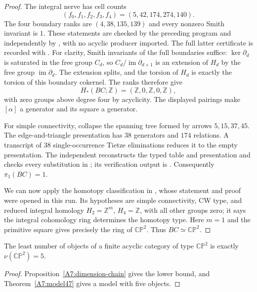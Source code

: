 \begin{proof}
The integral nerve has cell counts
\[
 (f_0,f_1,f_2,f_3,f_4)=(5,42,174,274,140).
\]
The four boundary ranks are $(4,38,135,139)$ and every nonzero
Smith invariant is $1$. These statements are checked by the
preceding program and independently by
, with no acyclic
producer imported. The full latter certificate is recorded with
.
For clarity, Smith invariants of the full boundaries suffice:
$\ker\partial_d$ is saturated in the free group $C_d$, so
$C_d/\operatorname{im}\partial_{d+1}$ is an extension of $H_d$
by the free group $\operatorname{im}\partial_d$. The extension
splits, and the torsion of $H_d$ is exactly the torsion of this
boundary cokernel. The ranks therefore give
\[
 H_*(BC;\mathbb Z)=(\mathbb Z,0,\mathbb Z,0,\mathbb Z),
\]
with zero groups above degree four by acyclicity. The displayed
pairings make $[\alpha]$ a generator and its square a generator.

For simple connectivity, collapse the spanning tree formed by
arrows $5,15,37,45$. The edge-and-triangle presentation has
$38$ generators and $174$ relations. A transcript of $38$
single-occurrence Tietze eliminations reduces it to the empty
presentation. The independent
 reconstructs the
typed table and presentation and checks every substitution in
; its verification output
is . Consequently
$\pi_1(BC)=1$.

We can now apply the homotopy classification in
\cite[Proposition~4C.3, pp.~430--431]{CP2-Hatcher2002}, whose
statement and proof were opened in this run. Its hypotheses are
simple connectivity, CW type, and reduced integral homology
$H_2=\mathbb Z^m$, $H_4=\mathbb Z$, with all other groups zero;
it says the integral cohomology ring determines the homotopy
type. Here $m=1$ and the primitive square gives precisely the
ring of $\mathbb{CP}^2$. Thus $BC\simeq\mathbb{CP}^2$.
\end{proof}

\begin{corollary}[Proved]\label{A7:nu}
The least number of objects of a finite acyclic category of type
$\mathbb{CP}^2$ is exactly $\nu(\mathbb{CP}^2)=5$.
\end{corollary}
\begin{proof}
Proposition~\ref{A7:dimension-chain} gives the lower bound, and
Theorem~\ref{A7:model47} gives a model with five objects.
\end{proof}


